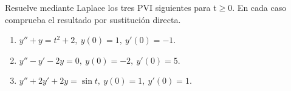 Resuelve mediante Laplace los tres PVI siguientes para t\ensuremath{\ge}0. En cada caso comprueba el resultado por sustitución directa.

\begin{enumerate}[label=(\alph*),ref=\alph*,leftmargin=*]
\item \(y''+y=t^2+2,\ y(0)=1,\ y'(0)=-1\).
\item \(y''-y'-2y=0,\ y(0)=-2,\ y'(0)=5\).
\item \(y''+2y'+2y=\sin t,\ y(0)=1,\ y'(0)=1\).
\end{enumerate}
